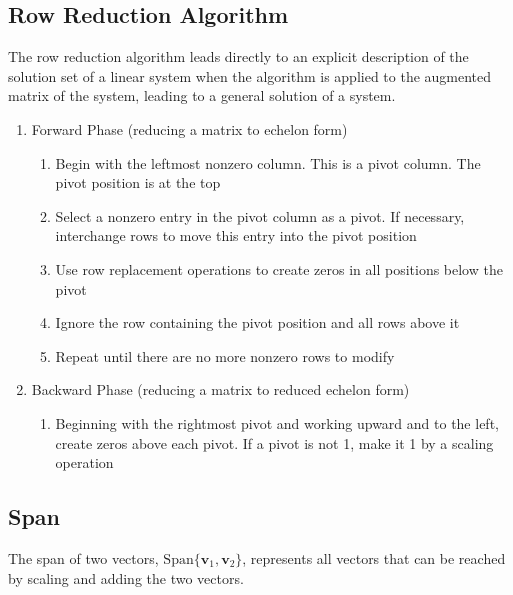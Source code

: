 \documentclass{article}
\begin{document}
\subsection*{Row Reduction Algorithm}
The row reduction algorithm leads directly to an explicit description of the solution set of a linear system when the algorithm is applied to the augmented matrix of the system, leading to a general solution of a system.
\begin{enumerate}
    \item Forward Phase (reducing a matrix to echelon form)
    \begin{enumerate}
        \item Begin with the leftmost nonzero column. This is a pivot column. The pivot position is at the top
        \item Select a nonzero entry in the pivot column as a pivot. If necessary, interchange rows to move this entry into the pivot position
        \item Use row replacement operations to create zeros in all positions below the pivot
        \item Ignore the row containing the pivot position and all rows above it
        \item Repeat until there are no more nonzero rows to modify    
    \end{enumerate}
    \item Backward Phase (reducing a matrix to reduced echelon form)
    \begin{enumerate}
        \item Beginning with the rightmost pivot and working upward and to the left, create zeros above each pivot. If a pivot is not 1, make it 1 by a scaling operation
    \end{enumerate}
\end{enumerate}

\subsection*{Span}
The span of two vectors, $\text{Span}\{\mathbf{v}_1, \mathbf{v}_2\}$, represents all vectors that can be reached by scaling and adding the two vectors.
\end{document}
